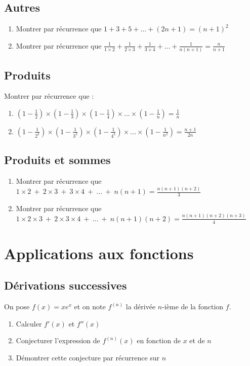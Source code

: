 \documentclass[oneside,12pt]{article}          %
\begin{document}
\subsection{Autres}
\begin{enumerate}
    \item Montrer par récurrence que $1+3+5+\ldots+(2n+1)=(n+1)^2$
    \item Montrer par récurrence que $\frac{1}{1\times2}+\frac{1}{2\times3}+\frac{1}{3\times4}+\ldots+\frac{1}{n(n+1)}=\frac{n}{n+1}$
\end{enumerate}


\subsection{Produits}

Montrer par récurrence que :
\begin{enumerate}
    \item $(1-\frac{1}{2})\times(1-\frac{1}{3})\times(1-\frac{1}{4})\times\ldots\times(1-\frac{1}{n})=\frac{1}{n}$
    \item $(1-\frac{1}{2^2})\times(1-\frac{1}{3^2})\times(1-\frac{1}{4^2})\times\ldots\times(1-\frac{1}{n^2})=\frac{n+1}{2n}$
\end{enumerate}



\subsection{Produits et sommes}
\begin{enumerate}
    \item Montrer par récurrence que $1\times2~+~2\times3~+~3\times4~+~\ldots~+~n(n+1)=\frac{n(n+1)(n+2)}{3}$
    \item Montrer par récurrence que $1\times2\times3~+~2\times3\times4~+~\ldots~+~n(n+1)(n+2)=\frac{n(n+1)(n+2)(n+3)}{4}$
\end{enumerate}



\section{Applications aux fonctions}

\subsection{Dérivations successives}
On pose $f(x)=xe^x$ et on note $f^{(n)}$ la dérivée $n$-ième de la fonction $f$.
\begin{enumerate}
	\item Calculer $f'(x)$ et $f''(x)$
	\item Conjecturer l'expression de $f^{(n)}(x)$ en fonction de $x$ et de $n$
	\item Démontrer cette conjecture par récurrence sur $n$
\end{enumerate}
\end{document}
